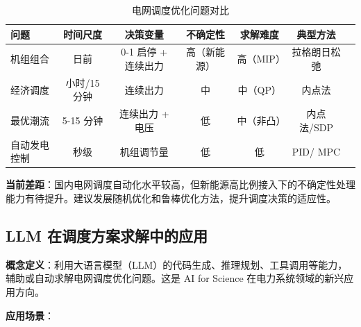 \documentclass[12pt,a4paper]{article}
\begin{document}
\begin{table}[h]
\centering
\caption{电网调度优化问题对比}
\label{tab:dispatch-problems}
\begin{tabular}{@{}lcccccc@{}}
\toprule
\textbf{问题} & \textbf{时间尺度} & \textbf{决策变量} & \textbf{不确定性} & \textbf{求解难度} & \textbf{典型方法} \\
\midrule
机组组合 & 日前 & 0-1 启停 + 连续出力 & 高（新能源） & 高（MIP） & 拉格朗日松弛 \\
经济调度 & 小时/15 分钟 & 连续出力 & 中 & 中（QP） & 内点法 \\
最优潮流 & 5-15 分钟 & 连续出力 + 电压 & 低 & 中（非凸） & 内点法/SDP \\
自动发电控制 & 秒级 & 机组调节量 & 低 & 低 & PID/ MPC \\
\bottomrule
\end{tabular}
\end{table}

\textbf{当前差距}：国内电网调度自动化水平较高，但新能源高比例接入下的不确定性处理能力有待提升。建议发展随机优化和鲁棒优化方法，提升调度决策的适应性。

\subsection{LLM 在调度方案求解中的应用}

\textbf{概念定义}：利用大语言模型（LLM）的代码生成、推理规划、工具调用等能力，辅助或自动求解电网调度优化问题。这是 AI for Science 在电力系统领域的新兴应用方向\cite{huang2022large}。

\textbf{应用场景}：
\end{document}
